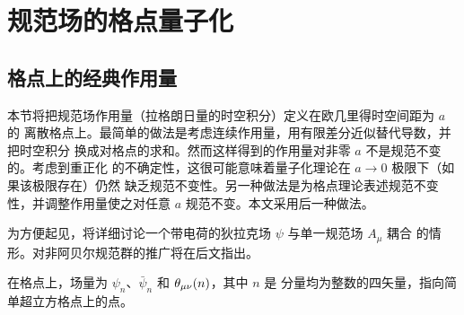 \section{规范场的格点量子化}\label{sec:lattice}

\subsection{格点上的经典作用量}\label{sec:classical}

本节将把规范场作用量（拉格朗日量的时空积分）定义在欧几里得时空间距为 $a$ 的
离散格点上。最简单的做法是考虑连续作用量，用有限差分近似替代导数，并把时空积分
换成对格点的求和。然而这样得到的作用量对非零 $a$ 不是规范不变的。考虑到重正化
的不确定性，这很可能意味着量子化理论在 $a \to 0$ 极限下（如果该极限存在）仍然
缺乏规范不变性。另一种做法是为格点理论表述规范不变性，并调整作用量使之对任意
$a$ 规范不变。本文采用后一种做法。

为方便起见，将详细讨论一个带电荷的狄拉克场 $\psi$ 与单一规范场 $A_{\mu}$ 耦合
的情形。对非阿贝尔规范群的推广将在后文指出。

在格点上，场量为 $\psi_{n}$、$\bar\psi_{n}$ 和 $\theta_{\mu\nu}(n)$，其中 $n$ 是
分量均为整数的四矢量，指向简单超立方格点上的点。

